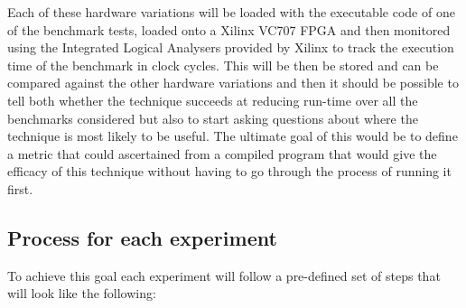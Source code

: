 Each of these hardware variations will be loaded with the executable code of one of the benchmark tests, loaded onto a Xilinx VC707 FPGA and then monitored using the Integrated Logical Analysers provided by Xilinx to track the execution time of the benchmark in clock cycles. This will be then be stored and can be compared against the other hardware variations and then it should be possible to tell both whether the technique succeeds at reducing run-time over all the benchmarks considered but also to start asking questions about where the technique is most likely to be useful. The ultimate goal of this would be to define a metric that could ascertained from a compiled program that would give the efficacy of this technique without having to go through the process of running it first.

\subsection{Process for each experiment}

To achieve this goal each experiment will follow a pre-defined set of steps that will look like the following:

